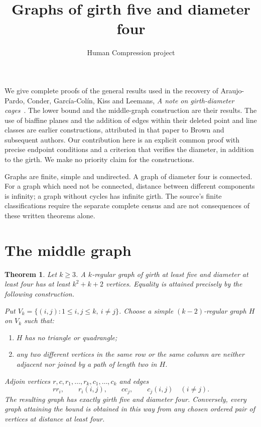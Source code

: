 \documentclass[11pt,a4paper]{article}
\title{Graphs of girth five and diameter four}
\author{Human Compression project}
\date{}
\newtheorem{theorem}{Theorem}
\begin{document}
\maketitle

We give complete proofs of the general results used in the recovery of
Araujo-Pardo, Conder, Garc\'ia-Col\'in, Kiss and Leemans,
\emph{A note on girth-diameter cages}~\cite{source}.
The lower bound and the middle-graph construction are their results.
The use of biaffine planes and the addition of edges within their deleted
point and line classes are earlier constructions, attributed in that
paper to Brown and subsequent authors. Our contribution here is an
explicit common proof with precise endpoint conditions and a criterion
that verifies the diameter, in addition to the girth. We make no priority
claim for the constructions.

Graphs are finite, simple and undirected. A graph of diameter four is
connected. For a graph which need not be connected, distance between
different components is infinity; a graph without cycles has infinite
girth. The source's finite classifications require the separate complete
census and are not consequences of these written theorems alone.

\section{The middle graph}

\begin{theorem}\label{thm:middle}
Let $k\geq3$. A $k$-regular graph of girth at least five and diameter
at least four has at least $k^2+k+2$ vertices. Equality is attained
precisely by the following construction.

Put $V_k=\{(i,j):1\leq i,j\leq k,\ i\ne j\}$. Choose a simple
$(k-2)$-regular graph $H$ on $V_k$ such that:
\begin{enumerate}
\item $H$ has no triangle or quadrangle;
\item any two different vertices in the same row or the same column
are neither adjacent nor joined by a path of length two in $H$.
\end{enumerate}
Adjoin vertices $r,c,r_1,\ldots,r_k,c_1,\ldots,c_k$ and edges
\[
 rr_i,\qquad r_i(i,j),\qquad cc_j,\qquad c_j(i,j)
 \quad(i\ne j).
\]
The resulting graph has exactly girth five and diameter four.
Conversely, every graph attaining the bound is obtained in this way
from any chosen ordered pair of vertices at distance at least four.
\end{theorem}
\end{document}
